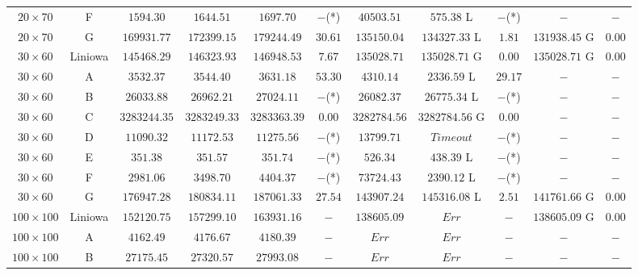 \begin{table}[H]
\begin{center}
{\begin{tabular}{c|c||c|c|c|c||c||c|c||c|c}
            $20 \times 70$ & F             & $1594.30$ & $1644.51$ & $1697.70$ & $-$(*)         & $40503.51$    & $575.38$ L & $-$(*)             & $-$ & $-$ \\
            $20 \times 70$ & G             & $169931.77$ & $172399.15$ & $179244.49$ & $30.61$  & $135150.04$   & $134327.33$ L & $1.81$          & $131938.45$ G & $0.00$ \\
            \hline  
            $30 \times 60$ & Liniowa       & $145468.29$ & $146323.93$ & $146948.53$ & $7.67$   & $135028.71$   & $135028.71$ G & $0.00$          & $135028.71$ G & $0.00$ \\
            $30 \times 60$ & A             & $3532.37$ & $3544.40$ & $3631.18$ & $53.30$        & $4310.14$     & $2336.59$ L & $29.17$           & $-$ & $-$ \\
            $30 \times 60$ & B             & $26033.88$ & $26962.21$ & $27024.11$ & $-$(*)      & $26082.37$    & $26775.34$ L & $-$(*)           & $-$ & $-$ \\
            $30 \times 60$ & C             & $3283244.35$ & $3283249.33$ & $3283363.39$ & $0.00$& $3282784.56$  & $3282784.56$ G & $0.00$         & $-$ & $-$ \\
            $30 \times 60$ & D             & $11090.32$ & $11172.53$ & $11275.56$ & $-$(*)      & $13799.71$    & $Time out$ & $-$(*)             & $-$ & $-$ \\
            $30 \times 60$ & E             & $351.38$ & $351.57$ & $351.74$ & $-$(*)            & $526.34$      & $438.39$ L & $-$(*)             & $-$ & $-$ \\
            $30 \times 60$ & F             & $2981.06$ & $3498.70$ & $4404.37$ & $-$(*)         & $73724.43$    & $2390.12$ L & $-$(*)            & $-$ & $-$ \\
            $30 \times 60$ & G             & $176947.28$ & $180834.11$ & $187061.33$ & $27.54$  & $143907.24$   & $145316.08$ L & $2.51$          & $141761.66$ G & $0.00$ \\
            \hline  
            $100 \times 100$ & Liniowa     & $152120.75$ & $157299.10$ & $163931.16$ & $-$      & $138605.09$   & $Err$ & $-$                     & $138605.09$ G & $0.00$ \\
            $100 \times 100$ & A           & $4162.49$ & $4176.67$ & $4180.39$ & $-$            & $Err$         & $Err$ & $-$                     & $-$ & $-$ \\
            $100 \times 100$ & B           & $27175.45$ & $27320.57$ & $27993.08$ & $-$         & $Err$         & $Err$ & $-$                     & $-$ & $-$ \\

\end{tabular}}
\end{center}
\end{table}
